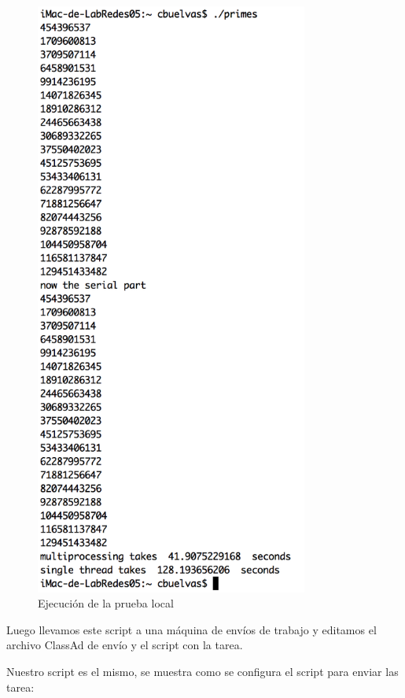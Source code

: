 \begin{figure}[h]
\centering
\includegraphics[width=0.8\textwidth]{images/localpython.png}
\decoRule
\caption{Ejecución de la prueba local}
\label{fig:python local test}
\end{figure}
\FloatBarrier

Luego llevamos este script a una máquina de envíos de trabajo y editamos el archivo ClassAd de envío y el script con la tarea.

Nuestro script es el mismo, se muestra como se configura el script para enviar las tarea:

